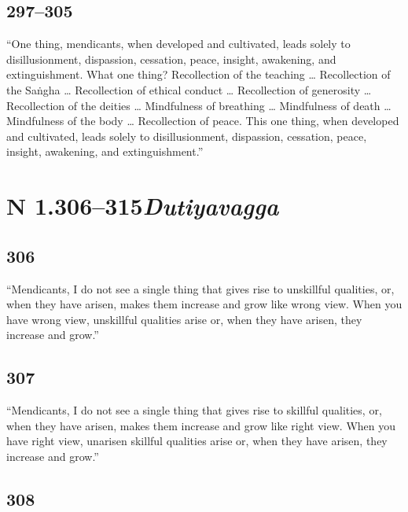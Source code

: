 \documentclass[12pt,openany]{book}%
\newcommand*{\suttatitleacronym}[1]{\smaller[2]{#1}\vspace*{.3em}}
\newcommand*{\suttatitleroot}[1]{\linebreak\smaller[2]\itshape{#1}}
\newcommand*{\tocacronym}[1]{\hspace*{-3.3em}{#1}\quad}
\newcommand*{\tocroot}[1]{(\textit{#1})}
\begin{document}
\subsection*{297–305 }

“One thing, mendicants, when developed and cultivated, leads solely to disillusionment, dispassion, cessation, peace, insight, awakening, and extinguishment. What one thing? Recollection of the teaching … Recollection of the \textsanskrit{Saṅgha} … Recollection of ethical conduct … Recollection of generosity … Recollection of the deities … Mindfulness of breathing … Mindfulness of death … Mindfulness of the body … Recollection of peace. This one thing, when developed and cultivated, leads solely to disillusionment, dispassion, cessation, peace, insight, awakening, and extinguishment.” 

%
\section*{{\suttatitleacronym AN 1.306–315}{\suttatitleroot Dutiyavagga}}
\addcontentsline{toc}{section}{\tocacronym{AN 1.306–315} \tocroot{Dutiyavagga}}

\subsection*{306 }

“Mendicants, I do not see a single thing that gives rise to unskillful qualities, or, when they have arisen, makes them increase and grow like wrong view. When you have wrong view, unskillful qualities arise or, when they have arisen, they increase and grow.” 

\subsection*{307 }

“Mendicants, I do not see a single thing that gives rise to skillful qualities, or, when they have arisen, makes them increase and grow like right view. When you have right view, unarisen skillful qualities arise or, when they have arisen, they increase and grow.” 

\subsection*{308 }
\end{document}
